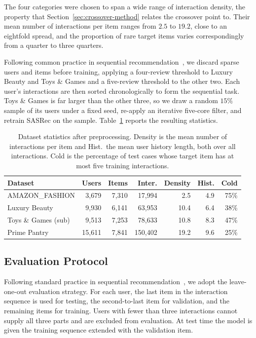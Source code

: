 \documentclass[runningheads]{llncs}
\begin{document}
The four categories were chosen to span a wide range of interaction density, the
property that Section~\ref{sec:crossover-method} relates the crossover point to. Their
mean number of interactions per item ranges from $2.5$ to $19.2$, close to an
eightfold spread, and the proportion of rare target items varies correspondingly from
a quarter to three quarters.

Following common practice in sequential recommendation~\cite{sasrec}, we discard
sparse users and items before training, applying a four-review threshold to Luxury
Beauty and Toys \& Games and a five-review threshold to the other two. Each user's interactions
are then sorted chronologically to form the sequential task. Toys \& Games is far
larger than the other three, so we draw a random $15\%$ sample of its users under a
fixed seed, re-apply an iterative five-core filter,
and retrain SASRec on the sample. Table~\ref{tab:datasets} reports the resulting
statistics.

\begin{table}[t]
\centering
\caption{Dataset statistics after preprocessing. Density is the mean number of
interactions per item and Hist.\ the mean user history length, both over all
interactions. Cold is the percentage of test cases whose target item has at most five
training interactions.}
\label{tab:datasets}
\begin{tabular}{lrrrrrr}
\toprule
Dataset & Users & Items & Inter. & Density & Hist. & Cold \\
\midrule
AMAZON\_FASHION     & 3,679  & 7,310 & 17,994  & 2.5  & 4.9 & 75\% \\
Luxury Beauty       & 9,930  & 6,141 & 63,953  & 10.4 & 6.4 & 38\% \\
Toys \& Games (sub) & 9,513  & 7,253 & 78,633  & 10.8 & 8.3 & 47\% \\
Prime Pantry        & 15,611 & 7,841 & 150,402 & 19.2 & 9.6 & 25\% \\
\bottomrule
\end{tabular}
\end{table}


\subsection{Evaluation Protocol}
\label{sec:protocol}

Following standard practice in sequential recommendation~\cite{sasrec}, we adopt the
leave-one-out evaluation strategy. For each user, the last item in the interaction
sequence is used for testing, the second-to-last item for validation, and the
remaining items for training. Users with fewer than three interactions cannot supply
all three parts and are excluded from evaluation. At test time the model is given the
training sequence extended with the validation item.
\end{document}
